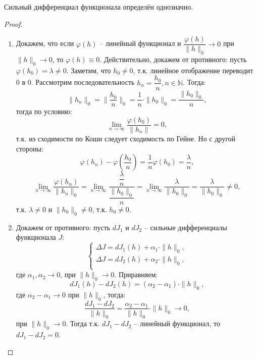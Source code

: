 \begin{theorem}
  Сильный дифференциал функционала определён однозначно.
\end{theorem}
\begin{proof}
  \begin{enumerate}
    \item Докажем, что если $\varphi(h)$ -- линейный функционал и
      $\dfrac{\varphi(h)}{\|h\|_0} \to 0$ при $\|h\|_0 \to 0$,
      то $\varphi(h) \equiv 0$. Действительно, докажем от противного: пусть
      $\varphi(h_0) = \lambda \neq 0$. Заметим, что $h_0 \neq 0$, т.к. линейное отображение
      переводит 0 в 0. Рассмотрим последовательность $h_n = \dfrac{h_0}{n}, n \in \mathbb{N}$.
      Тогда:
      \[
        \| h_n \|_0 = \|\dfrac{h_0}{n}\|_0 = \dfrac{1}{n} \cdot \|h_0\|_0 = \dfrac{\| h_0 \|_0}{n},
      \]
      тогда по условию: 
      \[
        \lim_{n\to\infty} \dfrac{\varphi(h_0)}{\|h_n\|} = 0,
      \]
      т.к. из сходимости по Коши следует сходимость по Гейне. Но с другой стороны:
      \[
        \varphi(h_n) - \varphi( \dfrac{h_0}{n} ) = \dfrac{1}{n} \varphi(h_0) = \dfrac{\lambda}{n},
      \]
      \[
        \lim_{n\to\infty} \dfrac{\varphi(h_n)}{\|h_n\|_0} =
        \lim_{n\to\infty} \dfrac{ \dfrac{\lambda}{n} }{ \dfrac{\|h_0\|_0}{n} } =
        \lim_{n\to\infty} \dfrac{\lambda}{\|h_0\|_0} =
        \dfrac{\lambda}{\|h_0\|_0} \neq 0,
      \]
      т.к. $\lambda \neq 0$ и $\|h_0\|_0 \neq 0$, т.к. $h_0 \neq 0$.

    \item Докажем от противного: пусть $dJ_1$ и $dJ_2$ -- сильные дифференциалы функционала $J$:
      \[
        \begin{cases}
          \Delta J = dJ_1(h) + \alpha_1 \cdot \|h\|_0, \\
          \Delta J = dJ_2(h) + \alpha_2 \cdot \|h\|_0, \\
        \end{cases}
      \]
      где $\alpha_1, \alpha_2 \to 0$, при $\|h\|_0 \to 0$.
      Приравняем:
      \[
        dJ_1 (h) - dJ_2 (h) = (\alpha_2 - \alpha_1) \cdot \|h\|_0,
      \]
      где $\alpha_2-\alpha_1 \to 0$ при $\|h\|_0$,
      тогда:
      \[
        \dfrac{dJ_1 - dJ_2}{\|h\|_0} = \dfrac{\alpha_2 - \alpha_1}{\|h\|_0} \cdot \|h\|_0 \to 0,
      \]
      при $\|h\|_0 \to 0$. Тогда т.к. $dJ_1 - dJ_2$ -- линейный функционал, то
      $dJ_1 - dJ_2 = 0$.
  \end{enumerate}
\end{proof}
